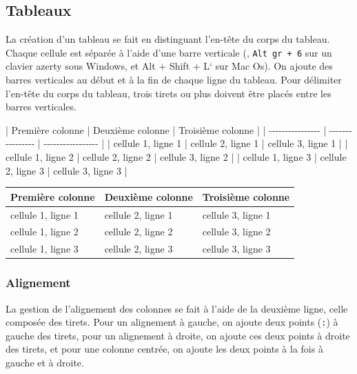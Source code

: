 \documentclass[
  11pt,
]{book}
\newenvironment{Shaded}{\begin{snugshade}}{\end{snugshade}}
\newcommand{\NormalTok}[1]{#1}
\numberwithin{equation}{section}
\numberwithin{countremarque}{section}
\begin{document}
\hypertarget{tableaux}{%
\subsection{Tableaux}\label{tableaux}}

La création d'un tableau se fait en distinguant l'en-tête du corps du tableau. Chaque cellule est séparée à l'aide d'une barre verticale (\texttt{\textbar{}}, \texttt{Alt\ gr\ +\ 6} sur un clavier azerty sous Windows, et Alt + Shift + L` sur Mac Os). On ajoute des barres verticales au début et à la fin de chaque ligne du tableau. Pour délimiter l'en-tête du corps du tableau, trois tirets ou plus doivent être placés entre les barres verticales.

\begin{Shaded}
\begin{Highlighting}[]
\NormalTok{| Première colonne | Deuxième colonne | Troisième colonne |}
\NormalTok{| {-}{-}{-}{-}{-}{-}{-}{-}{-}{-}{-}{-}{-}{-}{-}{-} | {-}{-}{-}{-}{-}{-}{-}{-}{-}{-}{-}{-}{-}{-}{-}{-} | {-}{-}{-}{-}{-}{-}{-}{-}{-}{-}{-}{-}{-}{-}{-}{-}{-} |}
\NormalTok{| cellule 1, ligne 1 | cellule 2, ligne 1 | cellule 3, ligne 1 |}
\NormalTok{| cellule 1, ligne 2 | cellule 2, ligne 2 | cellule 3, ligne 2 |}
\NormalTok{| cellule 1, ligne 3 | cellule 2, ligne 3 | cellule 3, ligne 3 |}
\end{Highlighting}
\end{Shaded}

\begin{longtable}[]{@{}lll@{}}
\toprule
Première colonne & Deuxième colonne & Troisième colonne \\
\midrule
\endhead
cellule 1, ligne 1 & cellule 2, ligne 1 & cellule 3, ligne 1 \\
cellule 1, ligne 2 & cellule 2, ligne 2 & cellule 3, ligne 2 \\
cellule 1, ligne 3 & cellule 2, ligne 3 & cellule 3, ligne 3 \\
\bottomrule
\end{longtable}

\hypertarget{alignement}{%
\subsubsection{Alignement}\label{alignement}}

La gestion de l'alignement des colonnes se fait à l'aide de la deuxième ligne, celle composée des tirets. Pour un alignement à gauche, on ajoute deux points (\texttt{:}) à gauche des tirets, pour un alignement à droite, on ajoute ces deux points à droite des tirets, et pour une colonne centrée, on ajoute les deux points à la fois à gauche et à droite.
\end{document}
